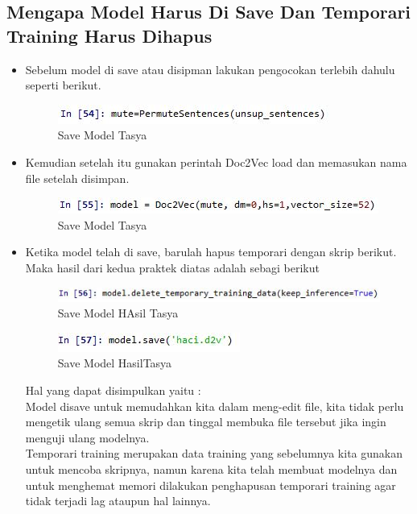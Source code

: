 \subsection{Mengapa Model Harus Di Save Dan Temporari Training Harus Dihapus}
\begin{itemize}
\item Sebelum model di save atau disipman lakukan pengocokan terlebih dahulu seperti berikut.
\begin{figure}[ht]
\centering
\includegraphics[scale=0.5]{figures/chapter5tasya23.jpg}
\caption{Save Model Tasya}
\label{Praktek}
\end{figure}
\item Kemudian setelah itu gunakan perintah Doc2Vec load dan memasukan nama file setelah disimpan.
\begin{figure}[ht]
\centering
\includegraphics[scale=0.5]{figures/chapter5tasya24.jpg}
\caption{Save Model Tasya}
\label{Praktek}
\end{figure}
\item Ketika model telah di save, barulah hapus temporari dengan skrip berikut. Maka hasil dari kedua praktek diatas adalah sebagi berikut
\begin{figure}[ht]
\centering
\includegraphics[scale=0.5]{figures/chapter5tasya25.jpg}
\caption{Save Model HAsil Tasya}
\label{Praktek}
\end{figure}
\begin{figure}[ht]
\centering
\includegraphics[scale=0.5]{figures/chapter5tasya26.jpg}
\caption{Save Model  HasilTasya}
\label{Praktek}
\end{figure}

Hal yang dapat disimpulkan yaitu :\\
Model disave untuk memudahkan kita dalam meng-edit file, kita tidak perlu mengetik ulang semua skrip dan tinggal membuka file tersebut jika ingin menguji ulang modelnya.\\
Temporari training merupakan data training yang sebelumnya kita gunakan untuk mencoba skripnya, namun karena kita telah membuat modelnya dan untuk menghemat memori dilakukan penghapusan temporari training agar tidak terjadi lag ataupun hal lainnya.
\end{itemize}


